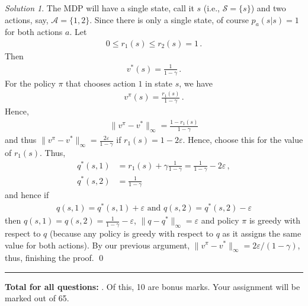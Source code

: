 \documentclass{article}
\newcommand{\norm}[1]{\| #1 \|}
\renewcommand{\epsilon}{\varepsilon}
\DeclareMathOperator*{\1}{\mathbbm{1}}
\newcommand{\0}{\mathbf{0}}
\newcounter{DocPoints} %
\theoremstyle{definition}
\theoremstyle{remark}
\newtheorem*{solution*}{Solution}
\newcommand{\cS}{\mathcal{S}}
\newcommand{\cA}{\mathcal{A}}
\begin{document}
\begin{solution*}
The MDP will have a single state, call it $s$ (i.e., $\cS = \{s\}$) and two actions, say, $\cA = \{1,2\}$.
Since there is only a single state, of course
$p_a(s|s)=1$ for both actions $a$.
Let
\begin{align*}
0\le r_1(s)\le r_2(s)=1\,.
\end{align*}
Then
\begin{align*}
v^*(s) = \frac{1}{1-\gamma}\,.
\end{align*}
For the policy $\pi$ that chooses action $1$ in state $s$, we have
\begin{align*}
v^\pi(s)=\frac{r_1(s)}{1-\gamma}\,.
\end{align*}
Hence,
\begin{align*}
\norm{v^\pi-v^*}_\infty=\frac{1-r_1(s)}{1-\gamma}
\end{align*}
and thus
$\norm{v^\pi-v^*}_\infty=\frac{2\varepsilon}{1-\gamma}$
if $r_1(s) = 1-2\varepsilon$.
Hence, choose this for the value of $r_1(s)$.
Thus,
\begin{align*}
q^*(s,1) &= r_1(s) + \gamma \frac{1}{1-\gamma} = \frac{1}{1-\gamma} - 2 \varepsilon\,,\\
q^*(s,2) &= \frac{1}{1-\gamma}
\end{align*}
and hence if
\begin{align*}
q(s,1) = q^*(s,1)+\varepsilon \text{ and }
q(s,2) = q^*(s,2)-\varepsilon
\end{align*}
then $q(s,1)=q(s,2) = \frac{1}{1-\gamma}-\epsilon$, $\norm{q-q^*}_\infty = \varepsilon$
and policy $\pi$ is greedy with respect to $q$ (because any policy is greedy with respect to $q$ as it assigns the same value for both actions). By our previous argument, $\norm{v^\pi-v^*}_\infty = 2\varepsilon/(1-\gamma)$, thus, finishing the proof.
\qed\par\smallskip\hrule
\end{solution*}


\bigskip
\bigskip

\noindent
\textbf{
Total for all questions: }.
Of this, 10 are bonus marks. 
Your assignment will be marked out of 65.
\end{document}
